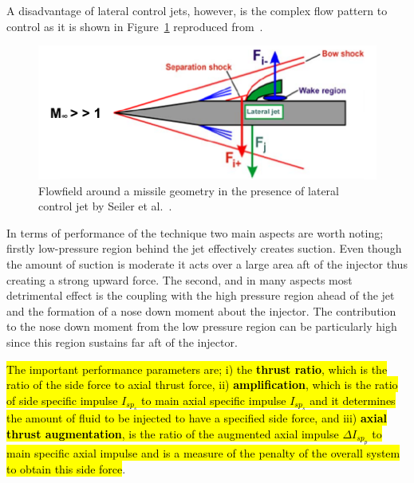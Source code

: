 \documentclass[12pt]{article}
\begin{document}
A disadvantage of lateral control jets, however, is the complex flow pattern to control as
it is shown in Figure~\ref{fig:seiler2003} reproduced from~\cite{Seiler2003}. 

\begin{figure}[H]
    \centering
    \includegraphics[width=\linewidth]{figs/fg2.png}
    \caption{Flowfield around a missile geometry in the presence of lateral control jet by Seiler et al.~\cite{Seiler2003}.}
    \label{fig:seiler2003}
\end{figure}

In terms of performance of the technique two main aspects are worth noting; firstly low-pressure region behind the jet effectively creates suction. Even though the amount of suction is moderate it acts over a large area aft of the injector thus creating a strong upward force. The second, and in many aspects most detrimental effect is the coupling with the high pressure region ahead of the jet and the formation of a nose down moment about the injector. The contribution to the nose down moment from the low pressure region can be particularly high since this region sustains far aft of the injector. %

\hl{The important performance parameters are; i) the \textbf{thrust ratio}, which is the ratio of the side force to axial thrust force, ii) \textbf{amplification}, which is the ratio of side specific impulse $I_{sp_s}$ to main axial specific impulse $I_{sp_s}$ and it determines the amount of fluid to be injected to have a specified side force, and iii) \textbf{axial thrust augmentation}, is the ratio of the augmented axial impulse $\Delta I_{sp_p}$ to main specific axial impulse and is a measure of the penalty of the overall system to obtain this side force}.
\end{document}
